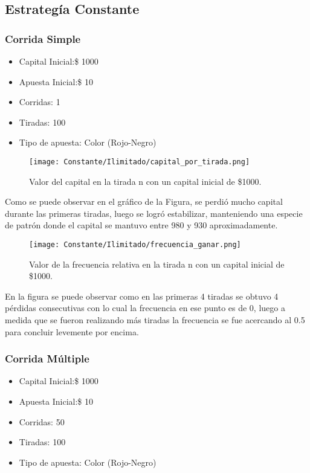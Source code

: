 \documentclass{article}
\begin{document}
\subsection{Estrategía Constante}
\subsubsection{Corrida Simple}

\begin{itemize}
\item Capital Inicial:\$ 1000
\item Apuesta Inicial:\$ 10
\item Corridas: 1
\item Tiradas: 100
\item Tipo de apuesta: Color (Rojo-Negro)
\end{itemize}

    \begin{figure} [H]
        \centering
         \texttt{[image: Constante/Ilimitado/capital\_por\_tirada.png]}
            \caption{Valor del capital en la tirada n con un capital inicial de \$1000.}
            \label{fig:grafico}
    \end{figure}

Como se puede observar en el gráfico de la Figura, se perdió mucho capital durante las primeras tiradas, luego se logró estabilizar, manteniendo una especie de patrón donde el capital se mantuvo entre 980 y 930 aproximadamente.

    \begin{figure} [H]
        \centering
         \texttt{[image: Constante/Ilimitado/frecuencia\_ganar.png]}
            \caption{Valor de la frecuencia relativa en la tirada n con un capital inicial de \$1000.}
            \label{fig:grafico}
    \end{figure}

En la figura se puede observar como en las primeras 4 tiradas se obtuvo 4 pérdidas consecutivas con lo cual la frecuencia en ese punto es de 0, luego a medida que se fueron realizando más tiradas la frecuencia se fue acercando al 0.5 para concluir levemente por encima.

\subsubsection{Corrida Múltiple}

\begin{itemize} [noitemsep]
\item Capital Inicial:\$ 1000
\item Apuesta Inicial:\$ 10
\item Corridas: 50
\item Tiradas: 100
\item Tipo de apuesta: Color (Rojo-Negro)
\end{itemize}
\end{document}
